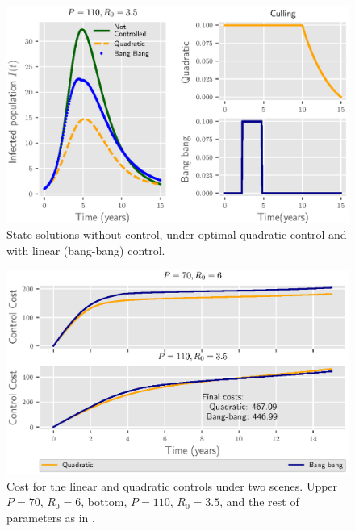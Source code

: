 \begin{figure}[H]
  \centering
  \includegraphics{Figures/figure_2_culling}
  \caption{State solutions without control, under optimal quadratic control 
  and with linear (bang-bang) control.}
  \label{fig:figure2culling}
\end{figure}

\begin{figure}[H]
  \centering
  \includegraphics{Figures/figure_3_culling}
  \caption{Cost for the linear and quadratic controls under two scenes. Upper
  $P=70$, $R_0=6$, bottom, $P=110$, $R_0=3.5$, and the rest of parameters as 
  in .}
  \label{fig:figure3culling}
\end{figure}